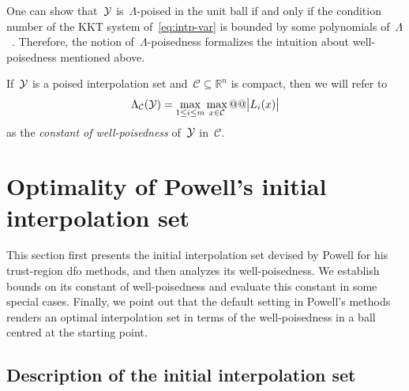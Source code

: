 \documentclass{article}
\makeatletter
\newcounter{cite}
\numberwithin{equation}{section}
\theoremstyle{definition}
\theoremstyle{plain}
\theoremstyle{remark}
\newcommand*{\abs}[2][]{#1\lvert#2#1\rvert}
\newcommand*{\R}{\mathbb{R}}
\newcommand*{\lagp}[1][]{L\ifblank{#1}{}{_{#1}}}
\newcommand*{\xpt}[1][]{\mathcal{Y}\ifblank{#1}{}{^{@#1}}}
\makeatother
\begin{document}
One can show that~$\xpt$ is~$\Lambda$-poised in the unit ball if and only if the condition number of the KKT system of~\eqref{eq:intp-var} is bounded by some polynomials of~$\Lambda$~\cite[Theorem~5.8]{Conn_Scheinberg_Vicente_2009}.
Therefore, the notion of~$\Lambda$-poisedness formalizes the intuition about well-poisedness mentioned above.

If~$\xpt$ is a poised interpolation set and~$\mathcal{C} \subseteq \R^n$ is compact, then we will refer to
\begin{equation*}
    \Lambda_{\mathcal{C}}(\xpt) = \max_{1 \le i \le m} \max_{x \in \mathcal{C}} @@ \abs[\big]{\lagp[i](x)}
\end{equation*}
as the \emph{constant of well-poisedness} of~$\xpt$ in~$\mathcal{C}$.

\section{Optimality of Powell's initial interpolation set}
\label{sec:main-result}

This section first presents the initial interpolation set devised by Powell for his trust-region \gls{dfo} methods, and then analyzes its well-poisedness.
We establish bounds on its constant of well-poisedness and evaluate this constant in some special cases.
Finally, we point out that the default setting in Powell's methods renders an optimal interpolation set in terms of the well-poisedness in a ball centred at the starting point.

\subsection{Description of the initial interpolation set}
\label{subsec:powell-set}
\end{document}
